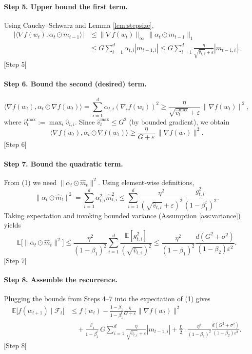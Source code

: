 \documentclass{article}
\begin{document}
\paragraph{Step 5. Upper bound the first term.}
Using Cauchy–Schwarz and Lemma \ref{lem:stepsize},
\[
\begin{aligned}
\bigl|\langle\nabla f(w_{t}),\alpha_{t}\odot m_{t-1}\rangle\bigr|
&\le \|\nabla f(w_{t})\|_{\infty}\,\|\alpha_{t}\odot m_{t-1}\|_{1}\\
&\le G\sum_{i=1}^{d}\alpha_{t,i}|m_{t-1,i}|
\le G\sum_{i=1}^{d}\frac{\eta}{\sqrt{\hat v_{t,i}}+\varepsilon}|m_{t-1,i}|.
\end{aligned}
\] 
[Step 5]

\paragraph{Step 6. Bound the second (desired) term.}
\[
\langle\nabla f(w_{t}),\alpha_{t}\odot\nabla f(w_{t})\rangle
= \sum_{i=1}^{d}\alpha_{t,i}(\nabla_{i}f(w_{t}))^{2}
\ge \frac{\eta}{\sqrt{\hat v_{t}^{\max}}+\varepsilon}\,\|\nabla f(w_{t})\|^{2},
\] 
where $\hat v_{t}^{\max}:=\max_{i}\hat v_{t,i}$. Since $\hat v_{t}^{\max}\le G^{2}$ (by bounded gradient), we obtain
\[
\langle\nabla f(w_{t}),\alpha_{t}\odot\nabla f(w_{t})\rangle
\ge \frac{\eta}{G+\varepsilon}\,\|\nabla f(w_{t})\|^{2}. \tag{2}
\] 
[Step 6]

\paragraph{Step 7. Bound the quadratic term.}
From (1) we need $\|\alpha_{t}\odot\hat m_{t}\|^{2}$. Using element‑wise definitions,
\[
\|\alpha_{t}\odot\hat m_{t}\|^{2}
= \sum_{i=1}^{d}\alpha_{t,i}^{2}\hat m_{t,i}^{2}
\le \sum_{i=1}^{d}\frac{\eta^{2}}{(\sqrt{\hat v_{t,i}}+\varepsilon)^{2}}\frac{g_{t,i}^{2}}{(1-\beta_{1}^{t})^{2}}.
\] 
Taking expectation and invoking bounded variance (Assumption \ref{ass:variance}) yields
\[
\mathbb{E}\!\bigl[\|\alpha_{t}\odot\hat m_{t}\|^{2}\bigr]
\le \frac{\eta^{2}}{(1-\beta_{1})^{2}}\sum_{i=1}^{d}\frac{\mathbb{E}[g_{t,i}^{2}]}{(\sqrt{\hat v_{t,i}})^{2}}
\le \frac{\eta^{2}}{(1-\beta_{1})^{2}}\frac{d(G^{2}+\sigma^{2})}{(1-\beta_{2})\varepsilon^{2}}. \tag{3}
\] 
[Step 7]

\paragraph{Step 8. Assemble the recurrence.}
Plugging the bounds from Steps 4–7 into the expectation of (1) gives
\[
\begin{aligned}
\mathbb{E}\!\bigl[f(w_{t+1})\mid\mathcal{F}_{t}\bigr]
&\le f(w_{t})
-\frac{1-\beta_{1}}{1-\beta_{1}^{t}}\frac{\eta}{G+\varepsilon}\|\nabla f(w_{t})\|^{2}\\
&\quad +\frac{\beta_{1}}{1-\beta_{1}^{t}}\,G\sum_{i=1}^{d}\frac{\eta}{\sqrt{\hat v_{t,i}}+\varepsilon}|m_{t-1,i}|
+\frac{L}{2}\cdot\frac{\eta^{2}}{(1-\beta_{1})^{2}}\frac{d(G^{2}+\sigma^{2})}{(1-\beta_{2})\varepsilon^{2}}.
\end{aligned}
\] 
[Step 8]
\end{document}
